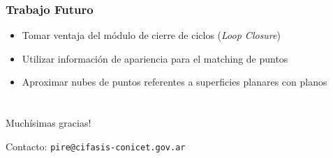 \documentclass[compress]{beamer}
\begin{document}
\begin{frame}
	\frametitle{Trabajo Futuro}
	\begin{itemize}
		\item Tomar ventaja del módulo de cierre de ciclos (\emph{Loop Closure})
		\item Utilizar información de apariencia para el matching de puntos
		\item Aproximar nubes de puntos referentes a superficies planares con planos
	\end{itemize}
\end{frame}



\section*{}

\begin{frame}
	\centering
	\Large{Muchísimas gracias!}
	
	
	\vspace{2cm}
	Contacto: {\tt pire@cifasis-conicet.gov.ar}
\end{frame}



\end{document}
